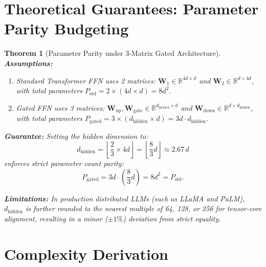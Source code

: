 \documentclass[11pt]{article}
\newtheorem{theorem}{Theorem}
\begin{document}
\section{Theoretical Guarantees: Parameter Parity Budgeting}
\label{sec:correctness}

\begin{theorem}[Parameter Parity under 3-Matrix Gated Architecture]
\label{thm:param_parity}
\textbf{Assumptions:}
\begin{enumerate}
    \item Standard Transformer FFN uses 2 matrices: $\mathbf{W}_1 \in \mathbb{R}^{4d \times d}$ and $\mathbf{W}_2 \in \mathbb{R}^{d \times 4d}$, with total parameters $P_{\text{std}} = 2 \times (4d \times d) = 8 d^2$.
    \item Gated FFN uses 3 matrices: $\mathbf{W}_{\text{up}}, \mathbf{W}_{\text{gate}} \in \mathbb{R}^{d_{\text{hidden}} \times d}$ and $\mathbf{W}_{\text{down}} \in \mathbb{R}^{d \times d_{\text{hidden}}}$, with total parameters $P_{\text{gated}} = 3 \times (d_{\text{hidden}} \times d) = 3 d \cdot d_{\text{hidden}}$.
\end{enumerate}

\textbf{Guarantee:}
Setting the hidden dimension to:
\begin{equation}
\label{eq:hidden_scale}
d_{\text{hidden}} = \left\lfloor \frac{2}{3} \times 4 d \right\rfloor = \left\lfloor \frac{8}{3} d \right\rfloor \approx 2.67 \, d
\end{equation}
enforces strict parameter count parity:
\begin{equation}
P_{\text{gated}} = 3 d \cdot \left( \frac{8}{3} d \right) = 8 d^2 = P_{\text{std}}.
\end{equation}

\textbf{Limitations:}
In production distributed LLMs (such as LLaMA and PaLM), $d_{\text{hidden}}$ is further rounded to the nearest multiple of 64, 128, or 256 for tensor-core alignment, resulting in a minor ($\pm 1\%$) deviation from strict equality.
\end{theorem}

\section{Complexity Derivation}
\label{sec:complexity}
\end{document}
